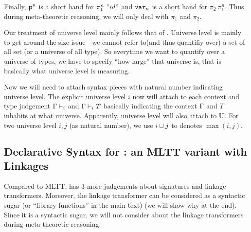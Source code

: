 Finally, $\SubstWeak{n}$ is a short hand for $\pi_1^n~"id"$ and $\var{n}$ is a short hand for $\pi_2~\pi_1^{n}$. Thus during meta-theoretic reasoning, we will only deal with $\pi_1$ and $\pi_2$.

 Our treatment of universe level mainly follows that of \citet{altkap2016, kaposi2019gluing}. Universe level is mainly to get around the size issue---we cannot refer to(and thus quantifiy over) a set of all set (or a universe of all type). So everytime we want to quantify over a universe of types, we have to specify ``how large'' that universe is, that is basically what universe level is measuring. 





Now we will need to attach syntax pieces with natural number indicating universe level. The explicit universe level $i$ now will attach to each context and type judgement $\goodCtx{\Gm}{i}$ and $\goodType{\Gm}{T}{i}$ basically indicating the context $\Gm$ and $T$ inhabits at what universe. Apparently, universe level will also attach to $\cU$. For two universe level $i,j$ (as natural number), we use $i \lcup j$ to denotes $\max(i,j)$.



\subsection{Declarative Syntax for \TT : an MLTT variant with Linkages}
Compared to MLTT, \TT has 3 more judgements about signatures and linkage transformers. Moreover, the linkage transformer can be considered as a syntactic sugar (or ``library functions'' in the main text) (we will show why at the end). 
Since it is a syntactic sugar, we will not consider about the linkage transformers during meta-theoretic reasoning.


